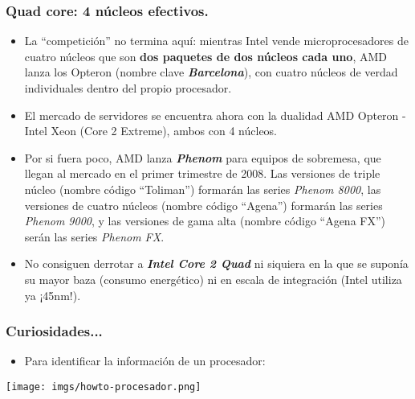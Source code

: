 \frame
{
\frametitle{Quad core: 4 núcleos efectivos.}
\begin{itemize}
 \item La ``competición'' no termina aquí: mientras Intel vende microprocesadores de cuatro núcleos que son \textbf{dos paquetes de dos núcleos cada uno}, AMD lanza los Opteron (nombre clave \textbf{\textit{Barcelona}}), con cuatro núcleos de verdad individuales dentro del propio procesador.
 \item El mercado de servidores se encuentra ahora con la dualidad AMD Opteron - Intel Xeon (Core 2 Extreme), ambos con 4 núcleos.
 \item Por si fuera poco, AMD lanza \textbf{\textit{Phenom}} para equipos de sobremesa, que llegan al mercado en el primer trimestre de 2008. Las versiones de triple núcleo (nombre código ``Toliman'') formarán las series \textit{Phenom 8000}, las versiones de cuatro núcleos (nombre código ``Agena'') formarán las series \textit{Phenom 9000}, y las versiones de gama alta (nombre código ``Agena FX'') serán las series \textit{Phenom FX}.
 \item No consiguen derrotar a \textbf{\textit{Intel Core 2 Quad}} ni siquiera en la que se suponía su mayor baza (consumo energético) ni en escala de integración (Intel utiliza ya ¡45nm!).

\end{itemize}
}

\frame
{
\frametitle{Curiosidades...}
\begin{itemize}
 \item Para identificar la información de un procesador:
\end{itemize}

\begin{center}
 \texttt{[image: imgs/howto-procesador.png]}
\end{center}
}

